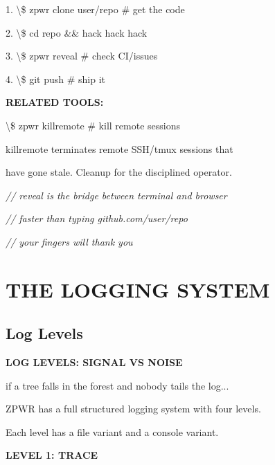 \documentclass[11pt,a4paper,twoside]{book}
\begin{document}
1. \textbackslash{}\$ zpwr clone user/repo       \# get the code

2. \textbackslash{}\$ cd repo \&\& hack hack hack

3. \textbackslash{}\$ zpwr reveal                \# check CI/issues

4. \textbackslash{}\$ git push                   \# ship it


\vspace{12pt}
{\bfseries\color{neonyellow} RELATED TOOLS:}\vspace{4pt}

\begin{codebox}
\textbackslash{}\$ zpwr killremote             \# kill remote sessions\\
\end{codebox}

killremote terminates remote SSH/tmux sessions that

have gone stale. Cleanup for the disciplined operator.

{\small\itshape\color{dimtext} // reveal is the bridge between terminal and browser}

{\small\itshape\color{dimtext} // faster than typing github.com/user/repo}

{\small\itshape\color{dimtext} // your fingers will thank you}


\vspace{16pt}


\chapter{THE LOGGING SYSTEM}

\section{Log Levels}


\vspace{10pt}
{\large\bfseries\color{neoncyan} LOG LEVELS: SIGNAL VS NOISE}\vspace{6pt}

if a tree falls in the forest and nobody tails the log...

ZPWR has a full structured logging system with four levels.

Each level has a file variant and a console variant.


\vspace{12pt}
{\bfseries\color{neonyellow} LEVEL 1: TRACE}\vspace{4pt}
\end{document}
